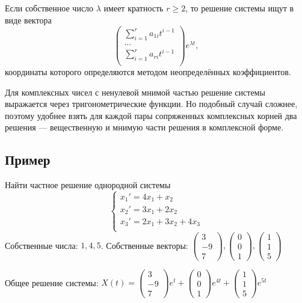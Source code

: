 \documentclass[12pt]{article}
\begin{document}
Если собственное число $\lambda$ имеет кратность $r \geq 2$, то решение системы ищут в виде вектора
\[
    \begin{pmatrix}
        \sum_{i = 1}^r a_{1i}t^{i - 1} \\
        ...                            \\
        \sum_{i = 1}^r a_{ri}t^{i - 1} \\
    \end{pmatrix} e^{\lambda t},
\]
координаты которого определяются методом неопределённых коэффициентов.

Для комплексных чисел с ненулевой мнимой частью решение системы выражается через тригонометрические функции. Но подобный случай сложнее, поэтому удобнее взять для каждой пары сопряженных комплексных корней два решения --- вещественную и мнимую части решения в комплексной форме.

\subsection{Пример}
Найти частное решение однородной системы
\[\begin{cases}
        x_1' = 4x_1 + x_2         \\
        x_2' = 3x_1 + 2x_2        \\
        x_3' = 2x_1 + 3x_2 + 4x_3 \\
    \end{cases}\]
Собственные числа: $1, 4, 5$. Собственные векторы: $
    \begin{pmatrix}3 \\ -9 \\ 7\end{pmatrix},
    \begin{pmatrix}0 \\ 0 \\ 1\end{pmatrix},
    \begin{pmatrix}1\\ 1 \\ 5\end{pmatrix}$

Общее решение системы: $X(t) =
    \begin{pmatrix}3 \\ -9 \\ 7\end{pmatrix}e^t +
    \begin{pmatrix}0 \\ 0 \\ 1\end{pmatrix}e^{4t} +
    \begin{pmatrix}1\\ 1 \\ 5\end{pmatrix}e^{5t}$
\end{document}
